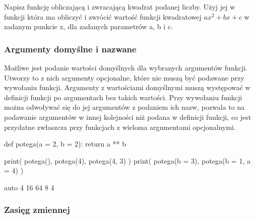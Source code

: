 \documentclass{pdfBooklets}
\begin{document}
\begin{Zadanie}{}{}

Napisz funkcję obliczającą i zwracającą kwadrat podanej liczby. Użyj jej w funkcji która ma obliczyć
i zwrócić wartość funkcji kwadratowej $ax^2 + bx + c$ w zadanym punkcie x, dla zadanych parametrów a, b i c.

\end{Zadanie}


\subsubsection{Argumenty domyślne i nazwane {\Symbola 🤔}}

Możliwe jest podanie wartości domyślnych dla wybranych argumentów funkcji. Utworzy to z nich argumenty opcjonalne, które nie muszą być podawane przy wywołaniu funkcji.
Argumenty z wartościami domyślnymi muszą występować w definicji funkcji po argumentach bez takich wartości.
Przy wywołaniu funkcji można odwoływać się do jej argumentów z podaniem ich nazw, pozwala to na podawanie argumentów w innej kolejności niż podana w definicji funkcji,
co jest przydatne zwłaszcza przy funkcjach z wieloma argumentami opcjonalnymi.

\begin{CodeFrame}[python]{.65\textwidth}
def potega(a = 2, b = 2):
    return a ** b

print( potega(), potega(4), potega(4, 3) )
print( potega(b = 3), potega(b = 1, a = 4) )
\end{CodeFrame}
\begin{CodeFrame}{auto}
4 16 64
8 4
\end{CodeFrame}

\subsubsection{Zasięg zmiennej {\Symbola 🤔}}
\end{document}
